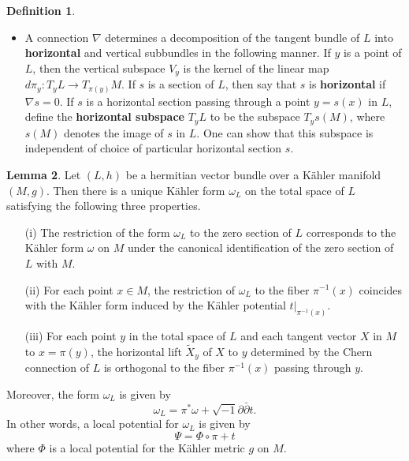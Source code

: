 \documentclass{article}
\numberwithin{equation}{section}
\theoremstyle{definition}
\newtheorem{definition}{Definition}[section]
\theoremstyle{theorem}
\newtheorem{lemma}[definition]{Lemma}
\newcommand{\ddb}{\partial\bar{\partial}}
\begin{document}
\begin{definition}
\begin{itemize}
\begin{enumerate}
\end{enumerate}
\item A connection $\nabla$ determines a decomposition of the tangent bundle of $L$ into \textbf{horizontal} and vertical subbundles in the following manner. If $y$ is a point of $L$, then the vertical subspace $V_y$ is the kernel of the linear map $d\pi_y : T_yL \to T_{\pi(y)}M$. If $s$ is a section of $L$, then say that $s$ is \textbf{horizontal} if $\nabla s = 0$. If $s$ is a horizontal section passing through a point $y = s(x)$ in $L$, define the \textbf{horizontal subspace} $T_yL$ to be the subspace $T_ys(M)$, where $s(M)$ denotes the image of $s$ in $L$. One can show that this subspace is independent of choice of particular horizontal section $s$. 
\end{itemize}
\end{definition}


\begin{lemma}\label{lem:form}
Let $(L,h)$ be a hermitian vector bundle over a K\"ahler manifold $(M,g)$. Then there is a unique K\"ahler form $\omega_L$ on the total space of $L$ satisfying the following three properties.
\begin{enumerate}
\item[(i)] The restriction of the form $\omega_L$ to the zero section of $L$ corresponds to the K\"ahler form $\omega$ on $M$ under the canonical identification of the zero section of $L$ with $M$. 
\item[(ii)] For each point $x \in M$, the restriction of $\omega_L$ to the fiber $\pi^{-1}(x)$ coincides with the K\"ahler form induced by the K\"ahler potential $t|_{\pi^{-1}(x)}$. 
\item[(iii)] For each point $y$ in the total space of $L$ and each tangent vector $X$ in $M$ to $x = \pi(y)$, the horizontal lift $\tilde{X}_y$ of $X$ to $y$ determined by the Chern connection of $L$ is orthogonal to the fiber $\pi^{-1}(x)$ passing through $y$. 
\end{enumerate}
Moreover, the form $\omega_L$ is given by 
\[
\omega_L = \pi^* \omega + \sqrt{-1} \ddb t. 
\]
In other words, a local potential for $\omega_L$ is given by 
\[
\Psi = \Phi \circ \pi + t
\]
where $\Phi$ is a local potential for the K\"ahler metric $g$ on $M$. 
\end{lemma}
\end{document}
